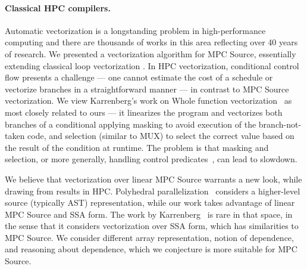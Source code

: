 \paragraph{Classical HPC compilers.}
Automatic vectorization is a longstanding problem in high-performance computing and
there are thousands of works in this area reflecting over 40 years of research. We presented a vectorization
algorithm for MPC Source, essentially extending classical loop vectorization \cite{Allen:1987}. In HPC vectorization, conditional control flow
presents a challenge --- one cannot estimate the cost of a schedule or vectorize branches in a straightforward manner --- in contrast to
MPC Source vectorization.
We view Karrenberg's work on Whole function vectorization~\cite{Karrenberg:2015} as most closely related to ours --- it linearizes the program and vectorizes
both branches of a conditional applying masking to avoid execution of the branch-not-taken code, and selection (similar to MUX) to select the correct value based on the
result of the condition at runtime.
The problem is that masking and selection, or more generally, handling control predicates~\cite{Benabderrahmane:2010,Karrenberg:2015},
can lead to slowdown.

We believe that vectorization over linear MPC Source warrants a new look, while drawing from
results in HPC.
Polyhedral parallelization~\cite{Benabderrahmane:2010} considers a higher-level source (typically AST)
representation, while our work takes advantage of linear MPC Source and SSA form. The work by Karrenberg~\cite{Karrenberg:2015} is rare in that space, in the sense that it considers
vectorization over SSA form, which has similarities to MPC Source. We consider different array representation, notion of dependence, and reasoning
about dependence, which we conjecture is more suitable for MPC Source. 
